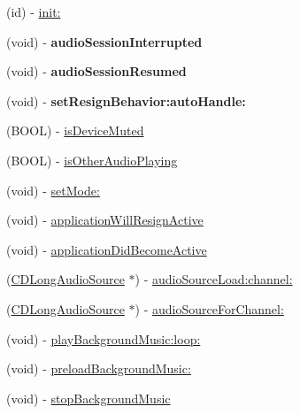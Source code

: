 \begin{DoxyCompactItemize}
\item 
(id) -\/ \hyperlink{interfaceCDAudioManager_ae2d8ef3daed8297ee37cd14b67687407}{init\+:}
\item 
\mbox{\label{interfaceCDAudioManager_aeeaf362faad4417ac15d22e0862c1641}} 
(void) -\/ {\bfseries audio\+Session\+Interrupted}
\item 
\mbox{\label{interfaceCDAudioManager_a844dd2990cbadb04e35364abed23f690}} 
(void) -\/ {\bfseries audio\+Session\+Resumed}
\item 
\mbox{\label{interfaceCDAudioManager_a861e77b8bef383849bc2335eaec5bff8}} 
(void) -\/ {\bfseries set\+Resign\+Behavior\+:auto\+Handle\+:}
\item 
(B\+O\+OL) -\/ \hyperlink{interfaceCDAudioManager_a5a4df8bc83cbc6e6723196d3d4ec4974}{is\+Device\+Muted}
\item 
(B\+O\+OL) -\/ \hyperlink{interfaceCDAudioManager_ab664b34e99f6f3e2158f2df910cf3a95}{is\+Other\+Audio\+Playing}
\item 
(void) -\/ \hyperlink{interfaceCDAudioManager_a72fd182d62cc75dfa3701da4a5d97346}{set\+Mode\+:}
\item 
(void) -\/ \hyperlink{interfaceCDAudioManager_a5265cc9a823688a547aa60e8995ba423}{application\+Will\+Resign\+Active}
\item 
(void) -\/ \hyperlink{interfaceCDAudioManager_aa572c7a296c0b2de3564f8da368835ef}{application\+Did\+Become\+Active}
\item 
(\hyperlink{interfaceCDLongAudioSource}{C\+D\+Long\+Audio\+Source} $\ast$) -\/ \hyperlink{interfaceCDAudioManager_a34c37890b0e9b8995230d1bdc9afa5a7}{audio\+Source\+Load\+:channel\+:}
\item 
(\hyperlink{interfaceCDLongAudioSource}{C\+D\+Long\+Audio\+Source} $\ast$) -\/ \hyperlink{interfaceCDAudioManager_a07f9dbc2d03a610a187675c6cfb24893}{audio\+Source\+For\+Channel\+:}
\item 
(void) -\/ \hyperlink{interfaceCDAudioManager_a940bfd555f763ee56217b6d589cb6a30}{play\+Background\+Music\+:loop\+:}
\item 
(void) -\/ \hyperlink{interfaceCDAudioManager_a613d13a6227a90dd5a073dbde1ac447b}{preload\+Background\+Music\+:}
\item 
(void) -\/ \hyperlink{interfaceCDAudioManager_a2403abdc32f144a0d57d915db42d35a6}{stop\+Background\+Music}
\item 

\end{DoxyCompactItemize}
